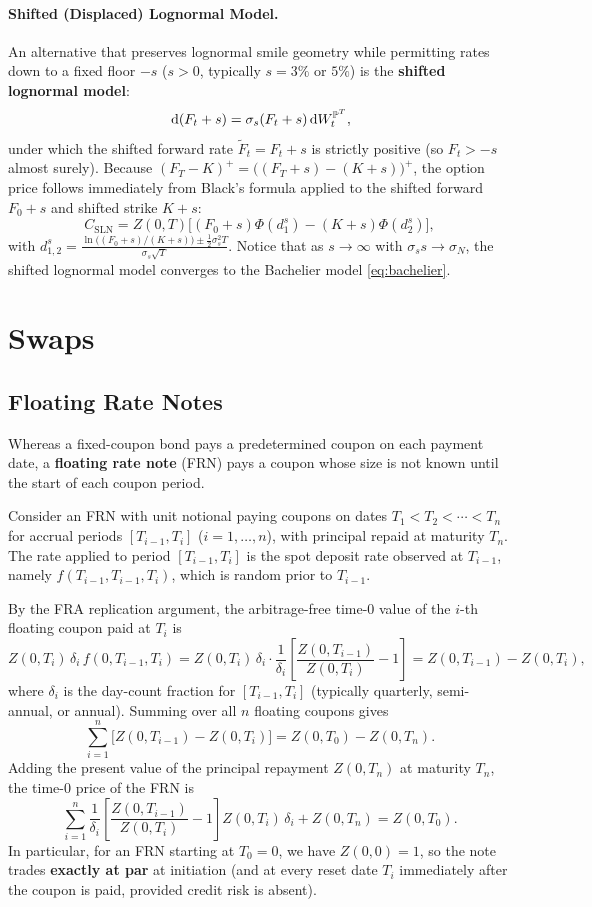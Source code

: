 \paragraph{Shifted (Displaced) Lognormal Model.}
An alternative that preserves lognormal smile geometry while permitting rates down to a fixed floor $-s$ ($s > 0$, typically $s = 3\%$ or $5\%$) is the \textbf{shifted lognormal model}:
\begin{equation}\label{eq:shifted-lognormal}
\,\mathrm{d}(F_t + s) = \sigma_s (F_t + s)\,\mathrm{d} W_t^{\mathbb{P}^T},
\end{equation}
under which the shifted forward rate $\widetilde{F}_t = F_t + s$ is strictly positive (so $F_t > -s$ almost surely). Because $(F_T - K)^+ = \bigl((F_T + s) - (K + s)\bigr)^+$, the option price follows immediately from Black's formula applied to the shifted forward $F_0 + s$ and shifted strike $K + s$:
\[
C_{\mathrm{SLN}} = Z(0, T)\bigl[(F_0 + s)\Phi(d_1^s) - (K + s)\Phi(d_2^s)\bigr],
\]
with $d_{1,2}^s = \frac{\ln\bigl((F_0 + s)/(K + s)\bigr) \pm \frac{1}{2}\sigma_s^2 T}{\sigma_s\sqrt{T}}$. Notice that as $s \to \infty$ with $\sigma_s s \to \sigma_N$, the shifted lognormal model converges to the Bachelier model \eqref{eq:bachelier}.

\section{Swaps}

\subsection*{Floating Rate Notes}
Whereas a fixed-coupon bond pays a predetermined coupon on each payment date, a \textbf{floating rate note} (FRN) pays a coupon whose size is not known until the start of each coupon period.

Consider an FRN with unit notional paying coupons on dates $T_1 < T_2 < \cdots < T_n$ for accrual periods $[T_{i-1}, T_i]$ ($i = 1, \ldots, n$), with principal repaid at maturity $T_n$. The rate applied to period $[T_{i-1}, T_i]$ is the spot deposit rate observed at $T_{i-1}$, namely $f(T_{i-1}, T_{i-1}, T_i)$, which is random prior to $T_{i-1}$.

By the FRA replication argument, the arbitrage-free time-$0$ value of the $i$-th floating coupon paid at $T_i$ is
\[
Z(0, T_i)\,\delta_i\,f(0, T_{i-1}, T_i) = Z(0, T_i)\,\delta_i \cdot \frac{1}{\delta_i}\left[\frac{Z(0, T_{i-1})}{Z(0, T_i)} - 1\right] = Z(0, T_{i-1}) - Z(0, T_i),
\]
where $\delta_i$ is the day-count fraction for $[T_{i-1}, T_i]$ (typically quarterly, semi-annual, or annual). Summing over all $n$ floating coupons gives
\[
\sum_{i=1}^n \bigl[Z(0, T_{i-1}) - Z(0, T_i)\bigr] = Z(0, T_0) - Z(0, T_n).
\]
Adding the present value of the principal repayment $Z(0, T_n)$ at maturity $T_n$, the time-$0$ price of the FRN is
\[
\sum_{i=1}^n \frac{1}{\delta_i}\left[\frac{Z(0, T_{i-1})}{Z(0, T_i)} - 1\right] Z(0, T_i)\,\delta_i + Z(0, T_n) = Z(0, T_0).
\]
In particular, for an FRN starting at $T_0 = 0$, we have $Z(0, 0) = 1$, so the note trades \textbf{exactly at par} at initiation (and at every reset date $T_i$ immediately after the coupon is paid, provided credit risk is absent).

